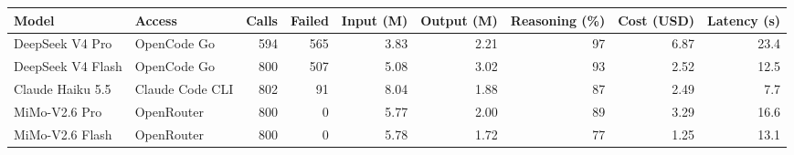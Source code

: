 \begin{tabular}{llrrrrrrr}
\toprule
Model & Access & Calls & Failed & Input (M) & Output (M) & Reasoning (\%) & Cost (USD) & Latency (s) \\
\midrule
DeepSeek V4 Pro & OpenCode Go & 594 & 565 & 3.83 & 2.21 & 97 & 6.87 & 23.4 \\
DeepSeek V4 Flash & OpenCode Go & 800 & 507 & 5.08 & 3.02 & 93 & 2.52 & 12.5 \\
Claude Haiku 5.5 & Claude Code CLI & 802 & 91 & 8.04 & 1.88 & 87 & 2.49 & 7.7 \\
MiMo-V2.6 Pro & OpenRouter & 800 & 0 & 5.77 & 2.00 & 89 & 3.29 & 16.6 \\
MiMo-V2.6 Flash & OpenRouter & 800 & 0 & 5.78 & 1.72 & 77 & 1.25 & 13.1 \\
\bottomrule
\end{tabular}
